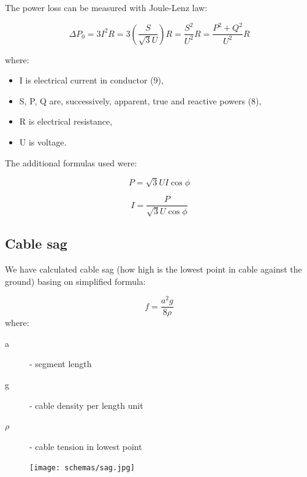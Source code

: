\documentclass[a4paper]{article}
\begin{document}
The power loss can be measured with Joule-Lenz law:

\begin{equation}
\Delta P_0 = 3I^{2}R = 3\left(\frac {S}{\sqrt{3}U}\right) R = \frac {S^{2}}{U^{2}} R = \frac {P^{2} + Q^{2}}{U^{2}} R
\end{equation}

where:
\begin{itemize}
	\setlength{\itemsep}{1pt}
	\setlength{\parskip}{0pt}
	\setlength{\parsep}{0pt}
\item I is electrical current in conductor (9),
\item S, P, Q are, successively, apparent, true and reactive powers (8),
\item R is electrical resistance,
\item U is voltage.
\end{itemize}

The additional formulas used were:

\begin{equation}
P = \sqrt{3}UI\cos{\phi}
\end{equation}

\begin{equation}
I = \frac {P}{\sqrt{3}U\cos{\phi}}
\end{equation}

\subsection{Cable sag}

We have calculated cable sag (how high is the lowest point in cable against the ground) basing on simplified formula:

\begin{equation}
f = \frac{a^2 g}{8 \rho}
\end{equation}
where:
\begin{description}
\item [a] - segment length
\item [g] - cable density per length unit
\item [$\rho$] - cable tension in lowest point\\
\end{description}

\begin{figure}[h]
\centering
\texttt{[image: schemas/sag.jpg]}
\caption{\label{fig:sag}}
\end{figure}

\clearpage
\end{document}
